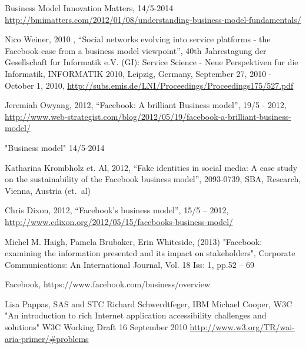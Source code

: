 \documentclass[conference]{IEEEtran}
\begin{document}
\begin{thebibliography}{1}

Business Model Innovation Matters,
14/5-2014
\href{http://bmimatters.com/2012/01/08/understanding-business-model-fundamentals/}{http://bmimatters.com/2012/01/08/understanding-business-model-fundamentals/}

Nico Weiner, 2010 , “Social networks evolving into service platforms - the
Facebook-case from a business model viewpoint”, 40th Jahrestagung der
Gesellschaft fur Informatik e.V. (GI): Service Science - Neue Perspektiven fur
die Informatik, INFORMATIK 2010, Leipzig, Germany, September 27, 2010 - October
1, 2010, \href{http://subs.emis.de/LNI/Proceedings/Proceedings175/527.pdf}{http://subs.emis.de/LNI/Proceedings/Proceedings175/527.pdf}

Jeremiah Owyang, 2012, “Facebook: A brilliant Business model”, 19/5 - 2012,
\href{http://www.web-strategist.com/blog/2012/05/19/facebook-a-brilliant-business-model/}{http://www.web-strategist.com/blog/2012/05/19/facebook-a-brilliant-business-model/}

"Business model"
14/5-2014
\bibitem{}
\bibitem{}
\bibitem{}
\bibitem{}
\bibitem{}

Katharina Krombholz et. Al, 2012, “Fake identities in social media: A case
study on the sustainability of the Facebook business model”, 2093-0739, SBA,
Research, Vienna, Austria (et.\ al)

Chris Dixon, 2012, “Facebook's business model”, 15/5 – 2012,
\href{http://www.cdixon.org/2012/05/15/facebooks-business-model/}{http://www.cdixon.org/2012/05/15/facebooks-business-model/}

Michel M. Haigh, Pamela Brubaker, Erin Whiteside, (2013) "Facebook: examining
the information presented and its impact on stakeholders", Corporate
Communications: An International Journal, Vol. 18 Iss: 1, pp.52 – 69

Facebook, https://www.facebook.com/business/overview



Lisa Pappas, SAS and STC
Richard Schwerdtfeger, IBM
Michael Cooper, W3C 
"An introduction to rich Internet application accessibility challenges and solutions"
W3C Working Draft 16 September 2010
\href{http://www.w3.org/TR/wai-aria-primer/\#problems}{http://www.w3.org/TR/wai-aria-primer/\#problems }


\end{thebibliography}
\end{document}
